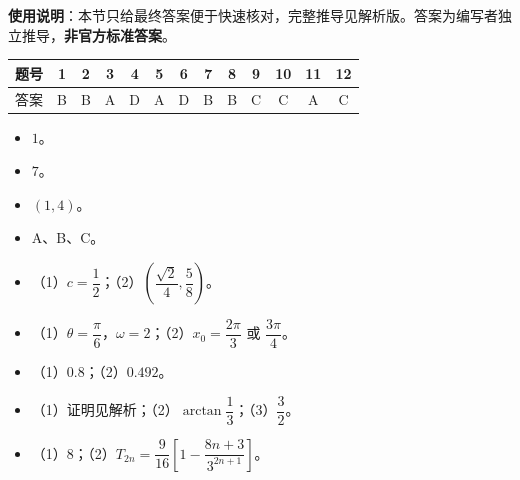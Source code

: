 
\begin{gknotice}
\textbf{使用说明}：本节只给最终答案便于快速核对，完整推导见解析版。答案为编写者独立推导，\textbf{非官方标准答案}。
\end{gknotice}

\begin{center}\begin{tabular}{ccccccccccccc}
\toprule
题号 & 1 & 2 & 3 & 4 & 5 & 6 & 7 & 8 & 9 & 10 & 11 & 12 \\
\midrule
答案 & B & B & A & D & A & D & B & B & C & C & A & C \\
\bottomrule
\end{tabular}\end{center}

\begin{itemize}[leftmargin=2.6em]
  \item[\textbf{13.}] $1$。
  \item[\textbf{14.}] $7$。
  \item[\textbf{15.}] $(1,4)$。
  \item[\textbf{16.}] A、B、C。
\end{itemize}

\begin{itemize}[leftmargin=2.6em]
  \item[\textbf{17.}] （1）$c=\dfrac12$；（2）$\left(\dfrac{\sqrt2}{4},\dfrac58\right)$。
  \item[\textbf{18.}] （1）$\theta=\dfrac{\pi}{6}$，$\omega=2$；（2）$x_0=\dfrac{2\pi}{3}$ 或 $\dfrac{3\pi}{4}$。
  \item[\textbf{19.}] （1）$0.8$；（2）$0.492$。
  \item[\textbf{20.}] （1）证明见解析；（2）$\arctan\dfrac13$；（3）$\dfrac32$。
  \item[\textbf{21.}] （1）$8$；（2）$T_{2n}=\dfrac9{16}\left[1-\dfrac{8n+3}{3^{2n+1}}\right]$。
\end{itemize}
